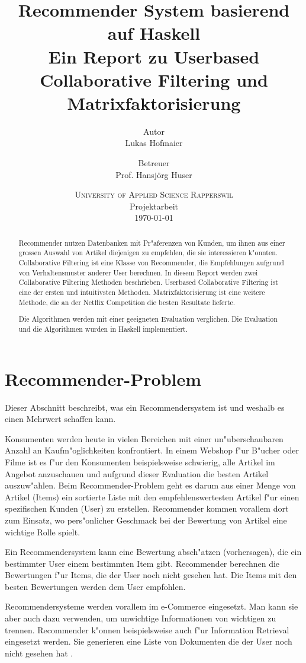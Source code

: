 \documentclass[a4paper, 12pt]{article}
\author{Autor \\ Lukas Hofmaier \and Betreuer\\ Prof. Hansjörg Huser \\}
\title{Recommender System basierend auf Haskell \\ \vspace{2 mm} {\large Ein Report zu Userbased Collaborative Filtering und Matrixfaktorisierung}}
\date{
\textsc{University of Applied Science Rapperswil}\\
Projektarbeit \\ \today
}
\begin{document}
\lstset{basicstyle=\small,
language=Haskell,
stringstyle=ttfamiliy
}

\maketitle
\newpage
\tableofcontents
\newpage
\begin{abstract}
Recommender nutzen Datenbanken mit Pr"aferenzen von Kunden, um ihnen aus einer grossen Auswahl von Artikel diejenigen zu empfehlen, die sie interessieren k"onnten. Collaborative Filtering ist eine Klasse von Recommender, die Empfehlungen aufgrund von Verhaltensmuster anderer User berechnen.
In diesem Report werden zwei Collaborative Filtering Methoden beschrieben. Userbased Collaborative Filtering ist eine der ersten und intuitivsten Methoden. Matrixfaktorisierung ist eine weitere Methode, die an der Netflix Competition die besten Resultate lieferte.

Die Algorithmen werden mit einer geeigneten Evaluation verglichen. Die Evaluation und die Algorithmen wurden in Haskell implementiert.

\end{abstract}

\section{Recommender-Problem}
\label{sec:problem}
Dieser Abschnitt beschreibt, was ein Recommendersystem ist und weshalb es einen Mehrwert schaffen kann.

Konsumenten werden heute in vielen Bereichen mit einer un"uberschaubaren Anzahl an Kaufm"oglichkeiten konfrontiert. In einem Webshop f"ur B"ucher oder Filme ist es f"ur den Konsumenten beispielsweise schwierig, alle Artikel im Angebot anzuschauen und aufgrund dieser Evaluation die besten Artikel auszuw"ahlen. Beim Recommender-Problem geht es darum aus einer Menge von Artikel (Items) ein sortierte Liste mit den empfehlenswertesten Artikel f"ur einen spezifischen Kunden (User) zu erstellen. Recommender kommen vorallem dort zum Einsatz, wo pers"onlicher Geschmack bei der Bewertung von Artikel eine wichtige Rolle spielt.

Ein Recommendersystem kann eine Bewertung absch"atzen (vorhersagen), die ein bestimmter User einem bestimmten Item gibt. Recommender berechnen die Bewertungen f"ur Items, die der User noch nicht gesehen hat. Die Items mit den besten Bewertungen werden dem User empfohlen.

Recommendersysteme werden vorallem im e-Commerce eingesetzt. Man kann sie aber auch dazu verwenden, um unwichtige Informationen von wichtigen zu trennen. Recommender k"onnen beispielsweise auch f"ur Information Retrieval eingesetzt werden. Sie generieren eine Liste von Dokumenten die der User noch nicht gesehen hat \cite{herlocker00}.
\end{document}
